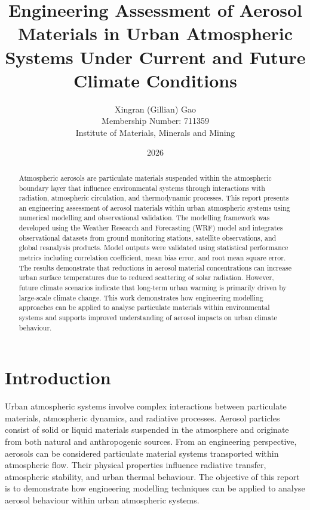 \documentclass[12pt]{article}
\title{Engineering Assessment of Aerosol Materials in Urban Atmospheric Systems Under Current and Future Climate Conditions}
\author{Xingran (Gillian) Gao \\ Membership Number: 711359 \\ Institute of Materials, Minerals and Mining}
\date{2026}
\begin{document}
\maketitle
\begin{abstract}
Atmospheric aerosols are particulate materials suspended within the atmospheric boundary layer that influence environmental systems through interactions with radiation, atmospheric circulation, and thermodynamic processes.
This report presents an engineering assessment of aerosol materials within urban atmospheric systems using numerical modelling and observational validation. The modelling framework was developed using the Weather Research and Forecasting (WRF) model and integrates observational datasets from ground monitoring stations, satellite observations, and global reanalysis products.
Model outputs were validated using statistical performance metrics including correlation coefficient, mean bias error, and root mean square error. The results demonstrate that reductions in aerosol material concentrations can increase urban surface temperatures due to reduced scattering of solar radiation. However, future climate scenarios indicate that long-term urban warming is primarily driven by large-scale climate change.
This work demonstrates how engineering modelling approaches can be applied to analyse particulate materials within environmental systems and supports improved understanding of aerosol impacts on urban climate behaviour.
\end{abstract}
\tableofcontents
\newpage
\section{Introduction}
Urban atmospheric systems involve complex interactions between particulate materials, atmospheric dynamics, and radiative processes. Aerosol particles consist of solid or liquid materials suspended in the atmosphere and originate from both natural and anthropogenic sources.
From an engineering perspective, aerosols can be considered particulate material systems transported within atmospheric flow. Their physical properties influence radiative transfer, atmospheric stability, and urban thermal behaviour.
The objective of this report is to demonstrate how engineering modelling techniques can be applied to analyse aerosol behaviour within urban atmospheric systems.
\end{document}
